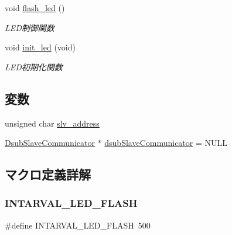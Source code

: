 \begin{DoxyCompactItemize}
void \mbox{\hyperlink{iraira__bo__up__down__mod_8ino_a4858ffbdc03c7fb912c742beba95c65c}{flash\+\_\+led}} ()
\begin{DoxyCompactList}\small\item\em L\+E\+D制御関数 \end{DoxyCompactList}\item 
void \mbox{\hyperlink{iraira__bo__up__down__mod_8ino_afc227daac655fc74c1537c0555055987}{init\+\_\+led}} (void)
\begin{DoxyCompactList}\small\item\em L\+E\+D初期化関数 \end{DoxyCompactList}\end{DoxyCompactItemize}
\subsection*{変数}
\begin{DoxyCompactItemize}
\item 
unsigned char \mbox{\hyperlink{iraira__bo__up__down__mod_8ino_aeba7e981bd419ac0d5ca8e5e4198bf06}{slv\+\_\+address}}
\item 
\mbox{\hyperlink{class_dsub_slave_communicator}{Dsub\+Slave\+Communicator}} $\ast$ \mbox{\hyperlink{iraira__bo__up__down__mod_8ino_adb2253a9db904473e0b317580548c627}{dsub\+Slave\+Communicator}} = N\+U\+LL
\end{DoxyCompactItemize}


\subsection{マクロ定義詳解}
\mbox{\label{iraira__bo__up__down__mod_8ino_a6e499958b5cdf86ac62e20b22bbb4bcc}} 
\subsubsection{\texorpdfstring{INTARVAL\_LED\_FLASH}{INTARVAL\_LED\_FLASH}}
{\footnotesize\ttfamily \#define I\+N\+T\+A\+R\+V\+A\+L\+\_\+\+L\+E\+D\+\_\+\+F\+L\+A\+SH~500}

\mbox{\label{iraira__bo__up__down__mod_8ino_aac54a414e7b061922e16432c9437e6b8}} 
